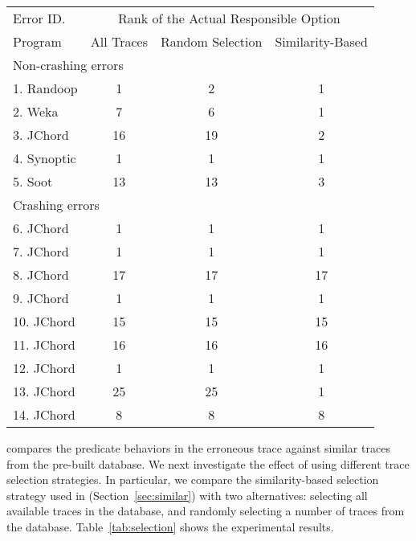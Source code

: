 \begin{table}[t]
\setlength{\tabcolsep}{.24\tabcolsep}
\begin{tabular}{|l|c|c||c|}
\hline
 Error ID. & \multicolumn{3}{|c|}{Rank of the Actual Responsible Option } \\
\cline{2-4}
 Program & All Traces & Random Selection&  Similarity-Based\\
 \hline
\hline
\multicolumn{4}{|l|}{Non-crashing errors}   \\
 \hline
 1. Randoop & 1 & 2 & 1\\
 2. Weka & 7 & 6 & 1\\
 3. JChord & 16 & 19 & 2\\
 4. Synoptic & 1 & 1 & 1\\
 5. Soot & 13 & 13 & 3\\
\hline
\hline
\multicolumn{4}{|l|}{Crashing errors}   \\
\hline
 6. JChord & 1 & 1 &1\\
 7. JChord & 1 & 1 &1\\
 8. JChord & 17 & 17 &17\\
 9. JChord & 1 &  1&1\\
 10. JChord & 15 & 15 &15\\
 11. JChord & 16 & 16 &16\\
 12. JChord & 1 & 1 &1\\
 13. JChord & 25 & 25 &1\\
 14. JChord & 8 & 8 &8\\
\hline
\end{tabular}

\end{table}


\ourtool compares the predicate behaviors in the erroneous trace against
similar traces from the pre-built database.
We next investigate the effect of using different trace selection strategies.
In particular, we compare the similarity-based selection strategy used in \ourtool
 (Section~\ref{sec:similar}) with two alternatives: selecting
all available traces in the database, and
randomly selecting a number of traces from the database.
Table~\ref{tab:selection} shows the experimental results.

